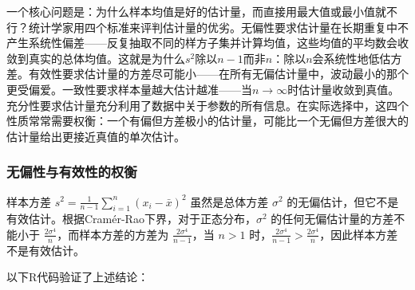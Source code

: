 \documentclass[
  twoside,12pt,fontset=none]{ctexbook}
\begin{document}
一个核心问题是：为什么样本均值是好的估计量，而直接用最大值或最小值就不行？统计学家用四个标准来评判估计量的优劣。无偏性要求估计量在长期重复中不产生系统性偏差------反复抽取不同的样方子集并计算均值，这些均值的平均数会收敛到真实的总体均值。这就是为什么\(s^2\)除以\(n-1\)而非\(n\)：除以\(n\)会系统性地低估方差。有效性要求估计量的方差尽可能小------在所有无偏估计量中，波动最小的那个更受偏爱。一致性要求样本量越大估计越准------当\(n \to \infty\)时估计量收敛到真值。充分性要求估计量充分利用了数据中关于参数的所有信息。在实际选择中，这四个性质常常需要权衡：一个有偏但方差极小的估计量，可能比一个无偏但方差很大的估计量给出更接近真值的单次估计。

\hypertarget{ux65e0ux504fux6027ux4e0eux6709ux6548ux6027ux7684ux6743ux8861}{%
\subsubsection{无偏性与有效性的权衡}\label{ux65e0ux504fux6027ux4e0eux6709ux6548ux6027ux7684ux6743ux8861}}

样本方差 \(s^2 = \frac{1}{n-1}\sum_{i=1}^{n} (x_i - \bar{x})^2\) 虽然是总体方差 \(\sigma^2\) 的无偏估计，但它不是有效估计。根据Cramér-Rao下界，对于正态分布，\(\sigma^2\) 的任何无偏估计量的方差不能小于 \(\frac{2\sigma^4}{n}\)，而样本方差的方差为 \(\frac{2\sigma^4}{n-1}\)，当 \(n > 1\) 时，\(\frac{2\sigma^4}{n-1} > \frac{2\sigma^4}{n}\)，因此样本方差不是有效估计。

以下R代码验证了上述结论：
\end{document}
